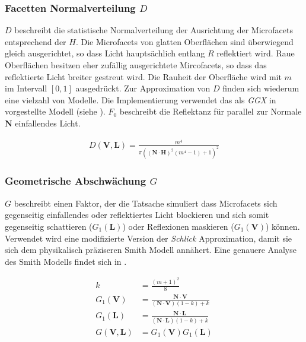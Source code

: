 \subsubsection[Facetten Normalverteilung]{Facetten Normalverteilung $D$} 
$D$ beschreibt die statistische Normalverteilung der Ausrichtung der Microfacets entsprechend der  $H$. Die Microfacets von glatten Oberflächen sind überwiegend gleich ausgerichtet, so dass Licht hauptsächlich entlang $R$ reflektiert wird. Raue Oberflächen besitzen eher zufällig ausgerichtete Mircofacets, so dass das reflektierte Licht breiter gestreut wird. Die Rauheit der Oberfläche wird mit $m$ im Intervall $[0,1]$ ausgedrückt. Zur Approximation von $D$ finden sich wiederum eine vielzahl von Modelle. Die Implementierung verwendet das als \textit{GGX} in \cite{Walter2007} vorgestellte Modell (siehe ). $F_0$ beschreibt die Reflektanz für parallel zur Normale $\mathbf N$ einfallendes Licht.

\begin{align}
	\label{eq:ggx}
	D(\mathbf V,\mathbf L) = \frac{m^4}{ \pi \left(\left( \mathbf N \cdot \mathbf H \right)^2\left(m^4 - 1\right) + 1\right)^2}
\end{align}


\subsubsection[Geometrische Abschwächung]{Geometrische Abschwächung $G$} 
$G$ beschreibt einen Faktor, der die Tatsache simuliert dass Microfacets sich gegenseitig einfallendes oder reflektiertes Licht blockieren und sich somit gegenseitig schattieren ($G_1(\mathbf L)$) oder Reflexionen maskieren ($G_1(\mathbf V)$) können. Verwendet wird eine modifizierte Version der \textit{Schlick} Approximation, damit sie sich dem physikalisch präziseren Smith Modell annähert. Eine genauere Analyse des Smith Modells findet sich in \cite[Kapitel 6, Seite 33]{Heitz2014}.

\begin{align}
	\label{eq:geometric-schlick}
	k &= \frac{(m + 1)^2}{8}\\
	G_1(\mathbf V) &= \frac{\mathbf N \cdot \mathbf V}{(\mathbf N \cdot \mathbf V)(1-k)+k}\\
	G_1(\mathbf L) &= \frac{\mathbf N \cdot \mathbf L}{(\mathbf N \cdot \mathbf L)(1-k)+k}\\
	G(\mathbf V,\mathbf L) &= G_1(\mathbf V) G_1(\mathbf L)
\end{align}


